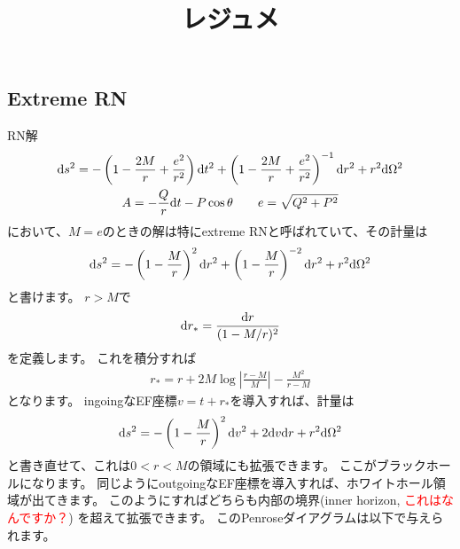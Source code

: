 \documentclass[a4paper, 12pt]{jsarticle}
\title{レジュメ}
\theoremstyle{definition}
\newcommand{\ddif}{{\rm d}}
\begin{document}
\maketitle

\setcounter{section}{6}
\setcounter{subsection}{4}

\subsection{Extreme RN}
RN解
\begin{gather}
	\ddif s^2 = - \left( 1 - \frac{2M}{r} + \frac{e^2}{r^2} \right) \ddif t^2
	+ \left( 1 - \frac{2M}{r} + \frac{e^2}{r^2} \right)^{-1} \ddif r^2
	+ r^2 \ddif \Omega^2 \\
	A = -\frac{Q}{r} \ddif t - P \cos \theta \qquad
	e = \sqrt{Q^2 + P^2}
\end{gather}
において、$M = e$のときの解は特にextreme RNと呼ばれていて、その計量は
\begin{align}
	\ddif s^2 = - \left( 1 - \frac{M}{r} \right)^2 \ddif r^2
	+ \left( 1 - \frac{M}{r} \right)^{-2} \ddif r^2 + r^2 \ddif \Omega^2
\end{align}
と書けます。
$r > M$で
\begin{align}
	\ddif r_* = \frac{\ddif r}{(1 - M / r)^2}
\end{align}
を定義します。
これを積分すれば
\begin{align}
	r_* = r + 2M \log \left| \frac{r - M}{M} \right| - \frac{M^2}{r - M}
\end{align}
となります。
ingoingなEF座標$v = t + r_*$を導入すれば、計量は
\begin{align}
	\ddif s^2 = - \left( 1 - \frac{M}{r} \right)^2 \ddif v^2
	+ 2 \ddif v \ddif r + r^2 \ddif \Omega^2
\end{align}
と書き直せて、これは$0 < r < M$の領域にも拡張できます。
ここがブラックホールになります。
同じようにoutgoingなEF座標を導入すれば、ホワイトホール領域が出てきます。
このようにすればどちらも内部の境界(inner horizon, \textcolor{red}{これはなんですか？})
を超えて拡張できます。
このPenroseダイアグラムは以下で与えられます。
\end{document}
